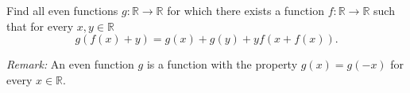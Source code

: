 Find all even functions $g\colon\mathbb{R} \to \mathbb{R}$ for which
there exists a function $f\colon\mathbb{R} \to \mathbb{R}$ such that for every $x,y \in \mathbb{R}$
$$g(f(x)+y)=g(x)+g(y)+yf(x+f(x)).$$

\emph{Remark:} An even function $g$ is a function with the property $g(x) = g(-x)$ for every $x \in \mathbb{R}$.
